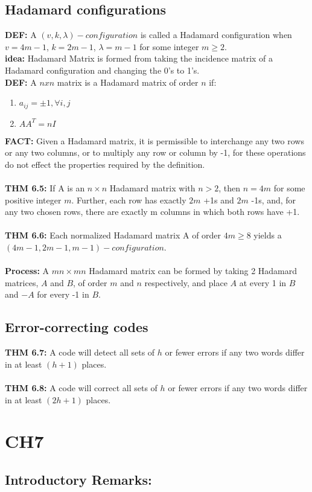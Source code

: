 \documentclass[12pt]{article}
\begin{document}
	\subsection{Hadamard configurations}
	\textbf{DEF: } A $ (v,k,\lambda)-configuration $ is called a Hadamard configuration  when $ v =
	4m-1 $, $ k = 2m -1 $, $ \lambda =	m - 	1 $ for some integer $ m\geq2 $. \\
	\textbf{idea: } Hadamard Matrix is formed from taking the incidence matrix of a Hadamard configuration and changing the 0's to 1's.\\
	\textbf{DEF: } A  $ nxn $ matrix is a Hadamard matrix of order $ n $ if:
	\begin{enumerate}
		\item$  a_{ij} = \pm1, \forall i,j$
		\item $ AA^T = nI $
	\end{enumerate}
	\textbf{FACT: } Given a Hadamard matrix, it is permissible to interchange any two	rows or any two columns, or to multiply any row or column by -1, for	these operations do not effect the properties required by the definition.\\\\
	\textbf{THM 6.5: } If A is an $ n\times n $ Hadamard matrix with $ n>2 $, then
	$ n= 4m $ for some positive integer $ m $. Further, each row has exactly $ 2m $ +1s
	and $ 2m $ -1s, and, for any two chosen rows, there are exactly m columns in which both rows have +1.\\\\
	\textbf{THM 6.6: } Each normalized Hadamard matrix A of order $ 4m \geq 8 $
	yields a $ (4m -1, 2m -	1,m -	1)-configuration $. \\\\
	\textbf{Process: } A $ mn\times mn $ Hadamard matrix can be formed by taking 2 Hadamard matrices, $ A $ and $ B $, of order $ m $ and $ n $ respectively, and place $ A $ at every 1 in $ B $ and $ -A $ for every -1 in $ B $.
	\subsection{Error-correcting codes}
	\textbf{THM 6.7: } A code will detect all sets of $ h $ or fewer errors if any	two words differ in at least $ (h + 1) $ places.\\\\
	\textbf{THM 6.8: } A code will correct all sets of $ h $ or fewer errors if any two words differ in at least $ (2h + 1) $ places.
	\section{CH7}
	\subsection{Introductory Remarks: }
\end{document}

